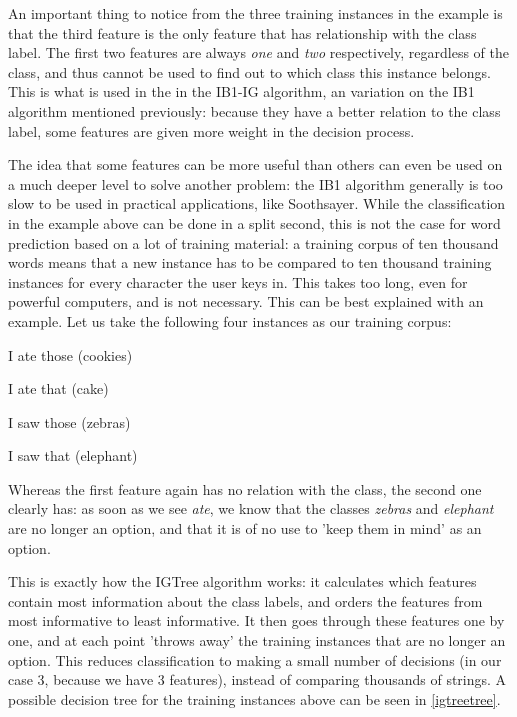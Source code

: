 \documentclass[11pt]{article}
\begin{document}
An important thing to notice from the three training instances in the example is that the third feature is the only feature that has relationship with the class label. The first two features are always \emph{one} and \emph{two} respectively, regardless of the class, and thus cannot be used to find out to which class this instance belongs. This is what is used in the in the IB1-IG algorithm, an variation on the IB1 algorithm mentioned previously: because they have a better relation to the class label, some features are given more weight in the decision process.

The idea that some features can be more useful than others can even be used on a much deeper level to solve another problem: the IB1 algorithm generally is too slow to be used in practical applications, like Soothsayer. While the classification in the example above can be done in a split second, this is not the case for word prediction based on a lot of training material: a training corpus of ten thousand words means that a new instance has to be compared to ten thousand training instances for every character the user keys in. This takes too long, even for powerful computers, and is not necessary. This can be best explained with an example. Let us take the following four instances as our training corpus:

\begin{examples}
\item I ate those (cookies)
\item I ate that (cake)
\item I saw those (zebras)
\item I saw that (elephant)
\end{examples}

Whereas the first feature again has no relation with the class, the second one clearly has: as soon as we see \emph{ate}, we know that the classes \emph{zebras} and \emph{elephant} are no longer an option, and that it is of no use to 'keep them in mind' as an option.

This is exactly how the IGTree algorithm \cite{daelemans+97} works: it calculates which features contain most information about the class labels, and orders the features from most informative to least informative. It then goes through these features one by one, and at each point 'throws away' the training instances that are no longer an option. This reduces classification to making a small number of decisions (in our case 3, because we have 3 features), instead of comparing thousands of strings. A possible decision tree for the training instances above can be seen in \ref{igtreetree}.
\end{document}
